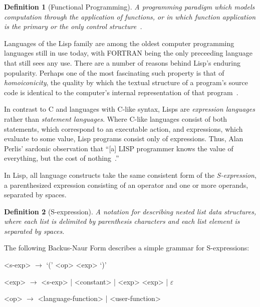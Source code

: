 \documentclass[11pt,a4paper]{article}
\theoremstyle{break}
\newtheorem{defn}{Definition}
\begin{document}
\begin{defn}[Functional Programming]
A programming paradigm which models computation through the application of functions, or in which function application is the primary or the only control structure~\cite{Wise:2003:FP:1074100.1074416}.
\end{defn}

Languages of the Lisp family are among the oldest computer programming languages still in use today, with FORTRAN being the only preceeding language that still sees any use. There are a number of reasons behind Lisp's enduring popularity. Perhaps one of the most fascinating such property is that of \textit{homoiconicity}, the quality by which the textual structure of a program's source code is identical to the computer's internal representation of that program~\cite{vanderhart2010macros,sicp}.

In contrast to C and languages with C-like syntax, Lisps are \textit{expression languages} rather than \textit{statement languages}. Where C-like languages consist of both statements, which correspond to an executable action, and expressions, which evaluate to some value, Lisp programs consist only of expressions. Thus, Alan Perlis' sardonic observation that ``[a] LISP programmer knows the value of everything, but the cost of nothing~\cite{Perlis:1982:SFE:947955.1083808}.''

In Lisp, all language constructs take the same consistent form of the \textit{S-expression}, a parenthesized expression consisting of an operator and one or more operands, separated by spaces.

\begin{defn}[S-expression]
A notation for describing nested list data structures, where each list is delimited by parenthesis characters and each list element is separated by spaces.
\end{defn}

The following Backus-Naur Form describes a simple grammar for S-expressions:
\begin{listing}[h]
    \centering
    \begin{grammar}
      <s-exp> $\to$ `(' <op> <exp> `)'

      <exp>  $\to$ <s-exp>  | <constant> | <exp> <exp> | $\varepsilon$

      <op>  $\to$ <language-function> | <user-function>
    \end{grammar}
    \caption{Backus-Naur form for a S-expression grammar~\cite{r6rs}.}
\end{listing}
\end{document}
